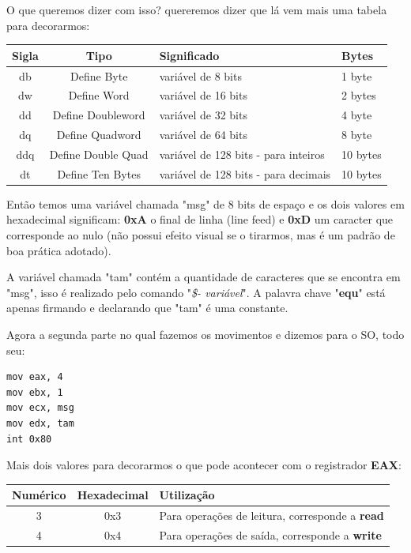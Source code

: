 O que queremos dizer com isso? quereremos dizer que lá vem mais uma tabela para decorarmos:
\begin{table}[H]
	\centering 
	\begin{tabular}{c | c | l | l }
		\textbf{Sigla} & \textbf{Tipo} & \textbf{Significado} & \textbf{Bytes} \\ \hline
		db & Define Byte & variável de 8 bits & 1 byte\\
		dw & Define Word & variável de 16 bits & 2 bytes \\
		dd & Define Doubleword & variável de 32 bits & 4 byte\\
		dq & Define Quadword & variável de 64 bits & 8 byte \\
		ddq & Define Double Quad & variável de 128 bits - para inteiros & 10 bytes \\
		dt & Define Ten Bytes & variável de 128 bits - para decimais & 10 bytes
	\end{tabular}
\end{table}

Então temos uma variável chamada "msg" de 8 bits de espaço e os dois valores em hexadecimal significam: \textbf{0xA} o final de linha (line feed) e \textbf{0xD} um caracter que corresponde ao nulo (não possui efeito visual se o tirarmos, mas é um padrão de boa prática adotado).

A variável chamada "tam" contém a quantidade de caracteres que se encontra em "msg", isso é realizado pelo comando "\textit{\$- variável}". A palavra chave "\textbf{equ}" está apenas firmando e declarando que "tam" é uma constante.

Agora a segunda parte no qual fazemos os movimentos e dizemos para o SO, todo seu:
\begin{lstlisting}[]
mov eax, 4
mov ebx, 1
mov ecx, msg
mov edx, tam
int 0x80
\end{lstlisting}

Mais dois valores para decorarmos o que pode acontecer com o registrador \textbf{EAX}:
\begin{table}[H]
	\centering 
	\begin{tabular}{c | c | l }
		\textbf{Numérico} & \textbf{Hexadecimal} & \textbf{Utilização} \\ \hline
		3 & 0x3 & Para operações de leitura, corresponde a \textbf{read} \\
		4 & 0x4 & Para operações de saída, corresponde a \textbf{write}
	\end{tabular}
\end{table}

